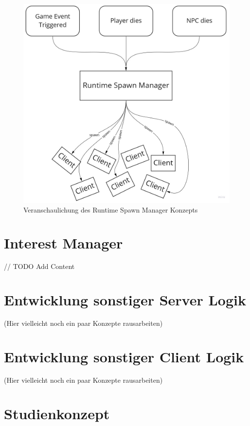 \begin{figure}
	\centering
	\includegraphics[width=150mm]{images/Runtime_Spawn_Manager.jpg}
	\caption[Runtime Spawn Manager]{Veranschaulichung des Runtime Spawn Manager Konzepts}
	\label{pic:Runtime_Spawn_Manager}
\end{figure}

\section{Interest Manager}

// TODO Add Content

\section{Entwicklung sonstiger Server Logik}

(Hier vielleicht noch ein paar Konzepte rausarbeiten)

\section{Entwicklung sonstiger Client Logik}

(Hier vielleicht noch ein paar Konzepte rausarbeiten)


\section{Studienkonzept}
\label{sec:studienkonzept}

